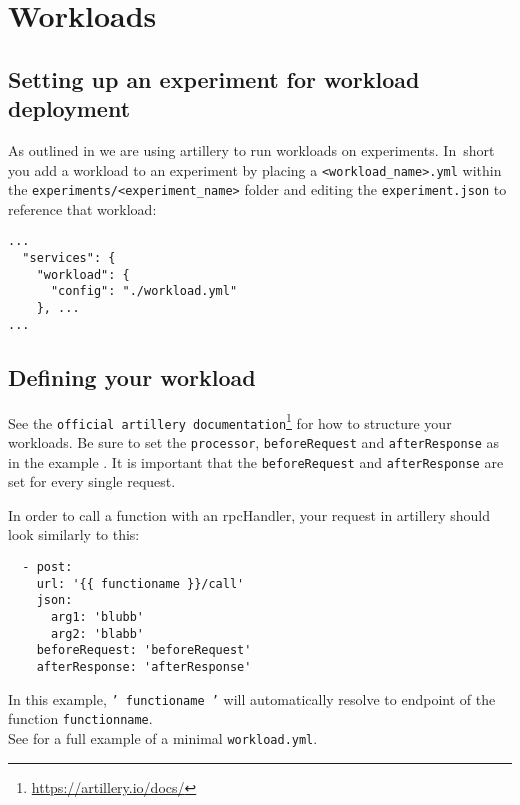 \documentclass[../main.tex]{subfiles}
\begin{document}
\section{Workloads}\label{sec:WorkloadsUsage}

\subsection{Setting up an experiment for workload deployment}

As outlined in  we are using artillery to run workloads on experiments. 
In~short you add a workload to an experiment by placing a \texttt{<workload\_name>.yml} 
within the \texttt{experiments/<experiment\_name>} 
folder and editing the \texttt{experiment.json} to reference that workload:

\begin{tcolorbox}[titleDetachedStyle, title=\texttt{experiment.json}]
\begin{verbatim}
...
  "services": {
    "workload": {
      "config": "./workload.yml"
    }, ...
...
\end{verbatim}
\end{tcolorbox}

\subsection{Defining your workload}

See the \texttt{official artillery documentation}\footnote{\url{https://artillery.io/docs/}} for how to structure your workloads. 
Be sure to set the \texttt{processor}, \texttt{beforeRequest} and \texttt{afterResponse} as in the example . 
It is important that the \texttt{beforeRequest} and \texttt{afterResponse} are set for every single request.

In order to call a function with an rpcHandler, your request in artillery should look similarly to this:
\begin{tcolorbox}[titleDetachedStyle, title=\texttt{workload.yml}]
\begin{verbatim}
  - post:
    url: '{{ functioname }}/call'
    json:
      arg1: 'blubb' 
      arg2: 'blabb'
    beforeRequest: 'beforeRequest'
    afterResponse: 'afterResponse'
\end{verbatim}
\end{tcolorbox}
In this example, \texttt{'{{ functioname }}'} will automatically resolve to endpoint of the function \texttt{functionname}. \\
See  for a full example of a minimal \texttt{workload.yml}.
\end{document}
